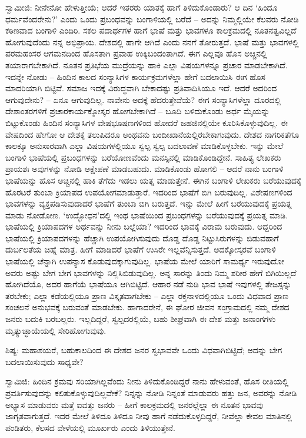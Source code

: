 ಸ್ವಾಮೀಜಿ: ನೀನೇನೋ ಹೇಳುತ್ತೀಯೆ; ಆದರೆ ಇತರರು ಯಾತಕ್ಕೆ ಹಾಗೆ ತಿಳಿದುಕೊಂಡಾರು? ಆ ದಿನ ‘ಹಿಂದೂ ಧರ್ಮವೆಂದರೇನು?’ ಎಂದು ಒಂದು ಪ್ರಬಂಧವನ್ನು ಬಂಗಾಳಿಯಲ್ಲಿ ಬರೆದೆ – ಅದನ್ನು ನಿಮ್ಮಲ್ಲಿಯೇ ಕೆಲವರು ನೋಡಿ ಕಠಿಣವಾದ ಬಂಗಾಳಿ ಎಂದಿರಿ. ಸಕಲ ಪದಾರ್ಥಗಳ ಹಾಗೆ ಭಾಷೆ ಮತ್ತು ಭಾವಗಳೂ ಕಾಲಕ್ರಮದಲ್ಲಿ ನೂತನತ್ವವಿಲ್ಲದೆ ಹೋಗುವುದೆಂದು ನನ್ನ ಅಭಿಪ್ರಾಯ. ದೇಶದಲ್ಲಿ ಹಾಗೇ ಆಗಿದೆ ಎಂದು ನನಗೆ ತೋರುತ್ತದೆ. ಭಾಷೆ ಮತ್ತು ಭಾವಗಳಲ್ಲಿ ಪರಮಹಂಸರ ಆಗಮನದಿಂದ ಹೊಸತಾಗಿ ಪ್ರವಾಹ ಉಕ್ಕಿಬಂದಂತಾಗಿದೆ. ಈಗ ಎಲ್ಲವೂ ಹೊಸ ಅಚ್ಚಿನಲ್ಲಿ ತಯಾರಾಗಬೇಕಾಗಿದೆ. ನೂತನ ಪ್ರತಿಭೆಯ ಮುದ್ರೆಯನ್ನು ಹಾಕಿ ಎಲ್ಲಾ ವಿಷಯಗಳನ್ನೂ ಪ್ರಚಾರ ಮಾಡಬೇಕಾಗಿದೆ. ಇದನ್ನೇ ನೋಡು – ಹಿಂದಿನ ಕಾಲದ ಸಂನ್ಯಾಸಿಗಳ ಕಾರ್ಯಕ್ರಮಗಳೆಲ್ಲಾ ಹೇಗೆ ಬದಲಾಯಿಸಿ ಈಗ ಹೊಸ ಮಾದರಿಯಾಗಿ ಬಿಟ್ಟಿವೆ. ಸಮಾಜ ಇದಕ್ಕೆ ವಿರುದ್ಧವಾಗಿ ಬೇಕಾದಷ್ಟು ಪ್ರತಿವಾದಿಸಿಯೂ ಇದೆ. ಆದರೆ ಅದರಿಂದ ಆಗುವುದೇನು? – ಏನೂ ಆಗುವುದಿಲ್ಲ. ನಾವೇನು ಅದಕ್ಕೆ ಹೆದರುತ್ತೇವೆಯೆ? ಈಗ ಸಂನ್ಯಾಸಿಗಳೆಲ್ಲಾ ದೂರದಲ್ಲಿ ದೇಶಾಂತರಗಳಿಗೆ ಪ್ರಚಾರಕಾರ್ಯಕ್ಕೋಸ್ಕರ ಹೋಗಬೇಕಾಗಿದೆ – ಬೂದಿ ಬಳಿದುಕೊಂಡು ಅರ್ಧ ಮೈಯನ್ನು ಬಿಟ್ಟುಕೊಂಡು ಹಿಂದಿನ ಸಂನ್ಯಾಸಿಗಳ ವೇಷಭೂಷಣಗಳಿಂದ ಹೋದರೆ ಜಹಜಿನಲ್ಲಿಯೇ ಕೂರಿಸಿಕೊಳ್ಳುವುದಿಲ್ಲ. ಈ ವೇಷದಿಂದ ಹೇಗೋ ಆ ದೇಶಕ್ಕೆ ತಲುಪಿದರೂ ಅಂಥವನು ಬಂದೀಖಾನೆಯಲ್ಲಿರಬೇಕಾಗುವುದು. ದೇಶದ ನಾಗರಿಕತೆಗೂ ಕಾಲಕ್ಕೂ ಅನುಸಾರವಾಗಿ ಎಲ್ಲಾ ವಿಷಯಗಳಲ್ಲಿಯೂ ಸ್ವಲ್ಪ ಸ್ವಲ್ಪ ಬದಲಾವಣೆ ಮಾಡಿಕೊಳ್ಳಬೇಕು. ಇನ್ನು ಮೇಲೆ ಬಂಗಾಳಿ ಭಾಷೆಯಲ್ಲಿ ಪ್ರಬಂಧಗಳನ್ನು ಬರೆಯೋಣವೆಂದು ಮನಸ್ಸಿನಲ್ಲಿ ಮಾಡಿಕೊಂಡಿದ್ದೇನೆ. ಸಾಹಿತ್ಯ ಲೇಖಕರು ಪ್ರಾಯಶಃ ಅವುಗಳನ್ನು ನೋಡಿ ಆಕ್ಷೇಪಣೆ ಮಾಡಬಹುದು. ಮಾಡಿಕೊಂಡು ಹೋಗಲಿ – ಆದರೆ ನಾನು ಬಂಗಾಳಿ ಭಾಷೆಯನ್ನು ಹೊಸ ಅಚ್ಚಿನಲ್ಲಿ ಹಾಕಿ ತೆಗೆದು ಇಡಲು ಯತ್ನ ಮಾಡುತ್ತೇನೆ. ಈಗಿನ ಬಂಗಾಳಿ ಲೇಖಕರು ಬರೆಯುವುದಕ್ಕೆ ಹೊರಟರೆ ತುಂಬಾ ಕ್ರಿಯಾಪದ ಉಪಯೋಗಮಾಡುತ್ತಾರೆ. ಇದರಿಂದ ಭಾಷೆಗೆ ಬಿಗಿ ಬರುವುದಿಲ್ಲ. ವಿಶೇಷಣಗಳಿಂದ ಭಾವಗಳನ್ನು ವ್ಯಕ್ತಪಡಿಸುವುದಾದರೆ ಭಾಷೆಗೆ ತುಂಬಾ ಬಿಗಿ ಬರುತ್ತದೆ. ಇನ್ನು ಮೇಲೆ ಹೀಗೆ ಬರೆಯುವುದಕ್ಕೆ ಪ್ರಯತ್ನ ಮಾಡು ನೋಡೋಣ. ‘ಉದ್ಭೋಧನ’ದಲ್ಲಿ ಇಂಥ ಭಾಷೆಯಿಂದ ಪ್ರಬಂಧಗಳನ್ನು ಬರೆಯುವುದಕ್ಕೆ ಪ್ರಯತ್ನ ಮಾಡಿ. ಭಾಷೆಯಲ್ಲಿ ಕ್ರಿಯಾಪದಗಳ ಅರ್ಥವನ್ನು ನೀನು ಬಲ್ಲೆಯಾ? ಇದರಿಂದ ಭಾವಕ್ಕೆ ವಿರಾಮ ಬರುವುದು. ಆದ್ದರಿಂದ ಭಾಷೆಯಲ್ಲಿ ಕ್ರಿಯಾಪದಗಳನ್ನು ಹೆಚ್ಚಾಗಿ ಉಪಯೋಗಿಸುವುದು ದೊಡ್ಡ ದೊಡ್ಡ ನಿಟ್ಟುಸಿರುಗಳನ್ನು ಬಿಡುವಹಾಗೆ ದುರ್ಬಲತೆಯ ಚಿಹ್ನೆ ಮಾತ್ರ. ಹೀಗೆ ಮಾಡಿದರೆ ಭಾಷೆಗೆ ಉಸಿರೇ ಇಲ್ಲವೆನ್ನಿಸುತ್ತದೆ. ಅದಕ್ಕೋಸ್ಕರವೆ ಬಂಗಾಳಿ ಭಾಷೆಯಲ್ಲಿ ಚೆನ್ನಾಗಿ ಉಪನ್ಯಾಸ ಕೊಡುವುದಕ್ಕಾಗುವುದಿಲ್ಲ. ಭಾಷೆಯ ಮೇಲೆ ಯಾರಿಗೆ ಸಾಮರ್ಥ್ಯ ಇರುವುದೋ ಅವರು ಅಷ್ಟು ಬೇಗ ಬೇಗ ಭಾವಗಳನ್ನು ನಿಲ್ಲಿಸಿಬಿಡುವುದಿಲ್ಲ. ಅನ್ನ ಸಾರನ್ನು ತಿಂದು ನಿಮ್ಮ ಶರೀರ ಹೇಗೆ ಬಿಗಿಯಿಲ್ಲದೆ ಹೋಗಿದೆಯೊ, ಅದರ ಹಾಗೆಯೆ ಭಾಷೆಯೂ ಆಗಿಬಿಟ್ಟಿದೆ. ಆಹಾರ ನಡೆ ನುಡಿ ಭಾವ ಭಾಷೆ ಇವುಗಳಲ್ಲಿ ತೇಜಸ್ಸನ್ನು ತರಬೇಕು; ಎಲ್ಲಾ ಕಡೆಯಲ್ಲಿಯೂ ಪ್ರಾಣ ವಿಸ್ತೃತವಾಗಬೇಕು – ಎಲ್ಲಾ ರಕ್ತನಾಳದಲ್ಲಿಯೂ ಒಂದು ವಿಧವಾದ ಪ್ರಾಣ ಸಂಚಲನೆ ಅನುಭವಕ್ಕೆ ಬರುವಂತೆ ಮಾಡಬೇಕು. ಹಾಗಾದರೇನೆ, ಈ ಘೋರ ಜೀವನ ಸಂಗ್ರಾಮದಲ್ಲಿ ನಮ್ಮ ದೇಶದ ಜನರು ಬದುಕಿ ಬರಬಲ್ಲರು. ಇಲ್ಲದಿದ್ದರೆ, ಸ್ವಲ್ಪದರಲ್ಲಿಯೆ, ಬಹು ಶೀಘ್ರವಾಗಿ ಈ ದೇಶ ಮತ್ತು ಜನಾಂಗಗಳು ಮೃತ್ಯುಚ್ಛಾಯೆಯಲ್ಲಿ ಸೇರಿಹೋಗುವುವು.

ಶಿಷ್ಯ: ಮಹಾಶಯರೆ, ಬಹುಕಾಲದಿಂದ ಈ ದೇಶದ ಜನರ ಸ್ವಭಾವವೇ ಒಂದು ವಿಧವಾಗಿಬಿಟ್ಟಿದೆ; ಅದನ್ನು ಬೇಗ ಬದಲಾಯಿಸುವುದು ಸಾಧ್ಯವೇ?

ಸ್ವಾಮಿಜಿ: ಹಿಂದಿನ ಕ್ರಮವು ಸರಿಯಾಗಿಲ್ಲವೆಂದು ನೀನು ತಿಳಿದುಕೊಂಡಿದ್ದರೆ ನಾನು ಹೇಳುವಂತೆ, ಹೊಸ ರೀತಿಯಲ್ಲಿ ಪ್ರವರ್ತಿಸುವುದನ್ನು ಕಲಿತುಕೊಳ್ಳುವುದಿಲ್ಲವೇಕೆ? ನಿನ್ನನ್ನು ನೋಡಿ ನಿನ್ನಂತೆ ಮಾಡುವರು ಹತ್ತು ಜನ, ಅವರನ್ನು ನೋಡಿ ಅಭ್ಯಾಸ ಮಾಡುವರು ಮತ್ತೆ ಐವತ್ತು ಜನರು – ಹೀಗೆ ಕಾಲಕ್ರಮದಲ್ಲಿ ಜನರಲ್ಲೆಲ್ಲಾ ಈ ನೂತನ ಭಾವವು ಜಾಗೃತವಾಗುತ್ತದೆ. ಇದರ ಮೇಲೆ ತಿಳಿದೂ ತಿಳಿದೂ ನೀವು ಹಾಗೆ ನಡೆದುಕೊಳ್ಳದಿದ್ದರೆ, ನೀವೆಲ್ಲಾ ಕೇವಲ ಮಾತಿನಲ್ಲಿ ಪಂಡಿತರು, ಕೆಲಸದ ವೇಳೆಯಲ್ಲಿ ಮೂರ್ಖರು ಎಂದು ತಿಳಿಯುತ್ತೇನೆ.

